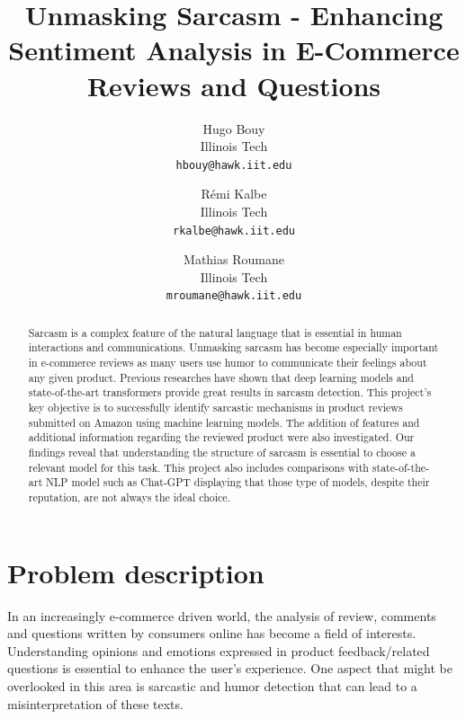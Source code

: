 \documentclass[10pt,twocolumn,letterpaper]{article}
\begin{document}
\title{Unmasking Sarcasm - Enhancing Sentiment Analysis in E-Commerce Reviews and Questions
}

\author{Hugo Bouy\\
Illinois Tech\\
{\tt\small hbouy@hawk.iit.edu}
\and
Rémi Kalbe\\
Illinois Tech\\
{\tt\small rkalbe@hawk.iit.edu}
\and
Mathias Roumane\\
Illinois Tech\\
{\tt\small mroumane@hawk.iit.edu}
}
\maketitle

\begin{abstract}
    Sarcasm is a complex feature of the natural language that is essential in human interactions and communications.
    Unmasking sarcasm has become especially important in e-commerce reviews as many users use humor to communicate their feelings about any given product.
    Previous researches have shown that deep learning models and state-of-the-art transformers provide great results in sarcasm detection.
    This project's key objective is to successfully identify sarcastic mechanisms in product reviews submitted on Amazon using machine learning models. 
    The addition of features and additional information regarding the reviewed product were also investigated.
    Our findings reveal that understanding the structure of sarcasm is essential to choose a relevant model for this task. 
    This project also includes comparisons with state-of-the-art NLP model such as Chat-GPT displaying that those type of models, despite their reputation, are not always the ideal choice. 
\end{abstract}


\section{Problem description}
\label{sec:intro}
In an increasingly e-commerce driven world, the analysis of review, comments and questions written by consumers online has become a field of interests.
Understanding opinions and emotions expressed in product feedback/related questions is essential to enhance the user’s experience.
One aspect that might be overlooked in this area is sarcastic and humor detection that can lead to a misinterpretation of these texts.
\end{document}

